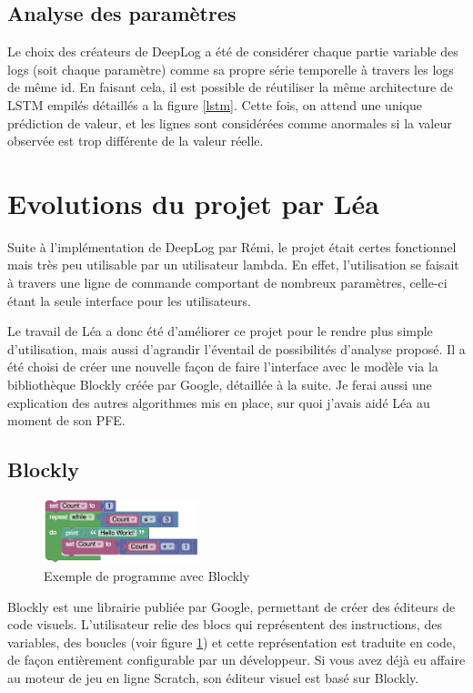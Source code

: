 \documentclass[openany, 11pt]{memoir}
\begin{document}
\subsection{Analyse des paramètres}

Le choix des créateurs de DeepLog a été de considérer chaque partie variable des \glspl{log} (soit chaque paramètre) comme sa propre série temporelle à travers les \glspl{log} de même id. En faisant cela, il est possible de réutiliser la même architecture de \gls{LSTM} empilés détaillés a la figure \ref{lstm}. Cette fois, on attend une unique prédiction de valeur, et les lignes sont considérées comme anormales si la valeur observée est trop différente de la valeur réelle.

\section{Evolutions du projet par Léa}

Suite à l'implémentation de DeepLog par Rémi, le projet était certes fonctionnel mais très peu utilisable par un utilisateur lambda. En effet, l'utilisation se faisait à travers une ligne de commande comportant de nombreux paramètres, celle-ci étant la seule interface pour les utilisateurs.

Le travail de Léa a donc été d'améliorer ce projet pour le rendre plus simple d'utilisation, mais aussi d'agrandir l'éventail de possibilités d'analyse proposé. Il a été choisi de créer une nouvelle façon de faire l'interface avec le modèle via la bibliothèque Blockly créée par Google, détaillée à la suite. Je ferai aussi une explication des autres algorithmes mis en place, sur quoi j'avais aidé Léa au moment de son PFE.

\subsection{Blockly}

\begin{figure}[ht]
	\centering
	\includegraphics[width=0.4\textwidth]{images/blockly.png}
	\caption{Exemple de programme avec Blockly}
	\label{blockly}
\end{figure}

Blockly est une librairie publiée par Google, permettant de créer des éditeurs de code visuels. L'utilisateur relie des blocs qui représentent des instructions, des variables, des boucles (voir figure \ref{blockly}) et cette représentation est traduite en code, de façon entièrement configurable par un développeur. Si vous avez déjà eu affaire au moteur de jeu en ligne Scratch, son éditeur visuel est basé sur Blockly.
\end{document}
